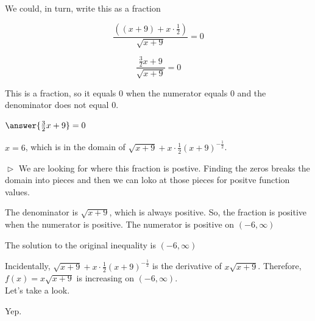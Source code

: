 \documentclass{ximera}
\begin{document}
\begin{example}
We could, in turn, write this as a fraction


\[ \frac{\left((x+9) + x \cdot \frac{1}{2}\right)}{\sqrt{x+9}} = 0 \]


\[ \frac{ \frac{3}{2} x + 9}{\sqrt{x+9}} = 0 \]



This is a fraction, so it equals $0$ when the numerator equals $0$ and the denominator does not equal $0$.


$\answer{\frac{3}{2} x + 9} = 0$



$x = 6$, which is in the domain of $\sqrt{x+9} + x \cdot \frac{1}{2} (x+9)^{-\tfrac{1}{2}}$. 

$\vartriangleright$ We are looking for where this fraction is postive. Finding the zeros breaks the domain into pieces and then we can loko at those pieces for positve function values.

The denominator is $\sqrt{x+9}$, which is always positive.  So, the fraction is positive when the numerator is positive.  The numerator is positive on $(-6, \infty)$ 





The solution to the original inequality is $(-6, \infty)$





\end{example}



Incidentally, $\sqrt{x+9} + x \cdot \frac{1}{2} (x+9)^{-\tfrac{1}{2}}$ is the derivative of $x \sqrt{x+9}$. Therefore, $f(x) = x \sqrt{x+9}$ is increasing on $(-6, \infty)$. \\

Let's take a look.







\begin{center}
\end{center}


Yep.
\end{document}
